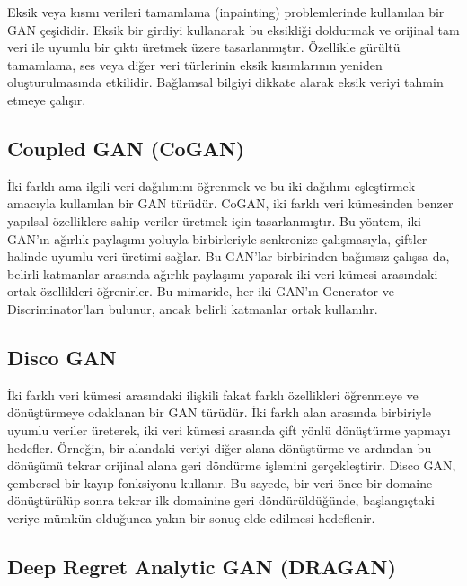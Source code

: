 Eksik veya kısmı verileri tamamlama (inpainting) problemlerinde kullanılan bir GAN çeşididir. Eksik bir girdiyi kullanarak bu eksikliği doldurmak ve orijinal tam veri ile uyumlu bir çıktı üretmek üzere tasarlanmıştır. Özellikle gürültü tamamlama, ses veya diğer veri türlerinin eksik kısımlarının yeniden oluşturulmasında etkilidir. Bağlamsal bilgiyi dikkate alarak eksik veriyi tahmin etmeye çalışır.

\newpage

\subsection{Coupled GAN (CoGAN)}

İki farklı ama ilgili veri dağılımını öğrenmek ve bu iki dağılımı eşleştirmek amacıyla kullanılan bir GAN türüdür. CoGAN, iki farklı veri kümesinden benzer yapılsal özelliklere sahip veriler üretmek için tasarlanmıştır. Bu yöntem, iki GAN'ın ağırlık paylaşımı yoluyla birbirleriyle senkronize çalışmasıyla, çiftler halinde uyumlu veri üretimi sağlar. Bu GAN'lar birbirinden bağımsız çalışsa da, belirli katmanlar arasında ağırlık paylaşımı yaparak iki veri kümesi arasındaki ortak özellikleri öğrenirler. Bu mimaride, her iki GAN'ın Generator ve Discriminator'ları bulunur, ancak belirli katmanlar ortak kullanılır. 

\newpage

\subsection{Disco GAN}

İki farklı veri kümesi arasındaki ilişkili fakat farklı özellikleri öğrenmeye ve dönüştürmeye odaklanan bir GAN türüdür. İki farklı alan arasında birbiriyle uyumlu veriler üreterek, iki veri kümesi arasında çift yönlü dönüştürme yapmayı hedefler. Örneğin, bir alandaki veriyi diğer alana dönüştürme ve ardından bu dönüşümü tekrar orijinal alana geri döndürme işlemini gerçekleştirir. Disco GAN, çembersel bir kayıp fonksiyonu kullanır. Bu sayede, bir veri önce bir domaine dönüştürülüp sonra tekrar ilk domainine geri döndürüldüğünde, başlangıçtaki veriye mümkün olduğunca yakın bir sonuç elde edilmesi hedeflenir.

\newpage

\subsection{Deep Regret Analytic GAN (DRAGAN)}

